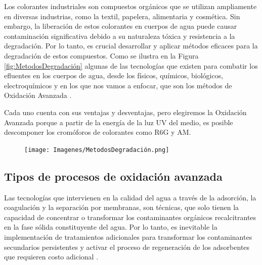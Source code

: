 \documentclass[12pt]{article}
\begin{document}
Los colorantes industriales son compuestos orgánicos que se utilizan ampliamente en diversas industrias, como la textil, papelera, alimentaria y cosmética. Sin embargo, la liberación de estos colorantes en cuerpos de agua puede causar contaminación significativa debido a su naturaleza tóxica y resistencia a la degradación. Por lo tanto, es crucial desarrollar y aplicar métodos eficaces para la degradación de estos compuestos.\vspace{1em} %
Como se ilustra en la Figura \ref{fig:MetodosDegradación} algunas de las tecnologías que existen para combatir los efluentes en los cuerpos de agua, desde los físicos, químicos, biológicos, electroquímicos y en los que nos vamos a enfocar, que son los métodos de Oxidación Avanzada  \cite{IEEEreferencias:OxiA1,IEEEreferencias:OxiA2,IEEEreferencias:OxiA3, IEEEreferencias:Oxidacion}.\vspace{1em} %

Cada uno cuenta con sus ventajas y desventajas, pero elegiremos la Oxidación Avanzada porque a partir de la energía de la luz UV del medio, es posible descomponer los cromóforos de colorantes como R6G y AM.

\begin{figure}[H]
    	   \begin{center}
     	  	\texttt{[image: Imagenes/MetodosDegradación.png]}
    	   \end{center} 
        \end{figure}


 \subsection{Tipos de procesos de oxidación avanzada} 

 Las tecnologías que intervienen en la calidad del agua a través de la adsorción, la coagulación y la separación por membranas, son técnicas, que solo tienen la capacidad de concentrar o transformar los contaminantes orgánicos recalcitrantes en la fase sólida constituyente del agua. Por lo tanto, es inevitable la implementación de tratamientos adicionales para transformar los contaminantes secundarios persistentes y activar el proceso de regeneración de los adsorbentes que requieren costo adicional \cite{IEEEreferencias:Ref5}.
\vspace{1em} %
\end{document}
